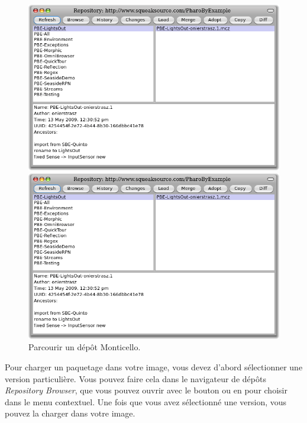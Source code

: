 \documentclass[a4paper,10pt,twoside]{book}
\begin{document}
\begin{figure}[hbt]
\ifluluelse
	{\centerline {\includegraphics[width=\textwidth]{BrowseRepository}}}
	{\centerline {\includegraphics[scale=0.7]{BrowseRepository}}}
\caption{Parcourir un dépôt Monticello.
}
\end{figure}


Pour charger un paquetage dans votre image, vous devez d'abord
sélectionner une version particulière. Vous pouvez faire cela dans le
navigateur de dépôts \emph{Repository Browser}, que vous pouvez ouvrir
avec le bouton  ou en \actclickant{}
pour choisir  dans le menu contextuel. %
Une fois que vous avez sélectionné une version, vous pouvez la
charger dans votre image.
\end{document}
